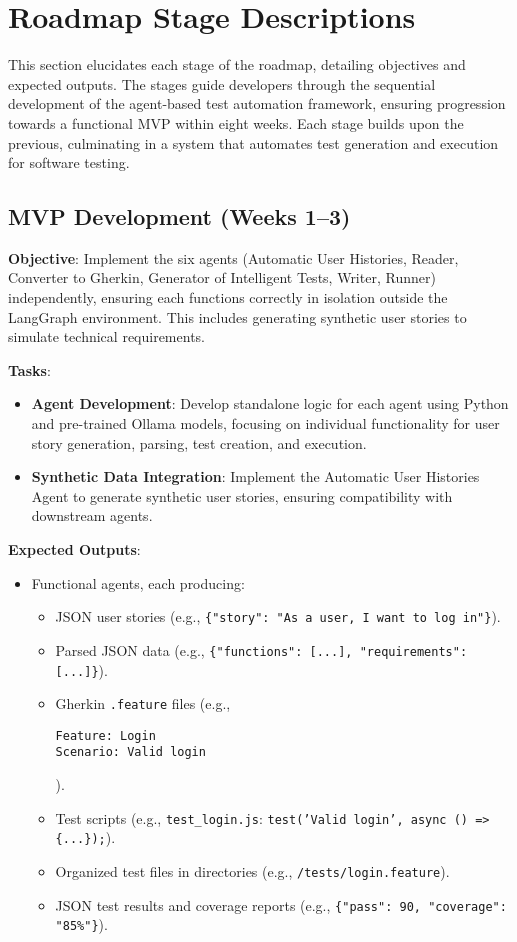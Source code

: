 \documentclass{article}
\begin{document}
\section{Roadmap Stage Descriptions}
This section elucidates each stage of the roadmap, detailing objectives and expected outputs. The stages guide developers through the sequential development of the agent-based test automation framework, ensuring progression towards a functional MVP within eight weeks. Each stage builds upon the previous, culminating in a system that automates test generation and execution for software testing.

\subsection{MVP Development (Weeks 1--3)}
\textbf{Objective}: Implement the six agents (Automatic User Histories, Reader, Converter to Gherkin, Generator of Intelligent Tests, Writer, Runner) independently, ensuring each functions correctly in isolation outside the LangGraph environment. This includes generating synthetic user stories to simulate technical requirements.

\textbf{Tasks}:
\begin{itemize}[label=--]
    \item \textbf{Agent Development}: Develop standalone logic for each agent using Python and pre-trained Ollama models, focusing on individual functionality for user story generation, parsing, test creation, and execution.
    \item \textbf{Synthetic Data Integration}: Implement the Automatic User Histories Agent to generate synthetic user stories, ensuring compatibility with downstream agents.
\end{itemize}

\textbf{Expected Outputs}:
\begin{itemize}[label=--]
    \item Functional agents, each producing:
    \begin{itemize}[label=$\circ$]
        \item JSON user stories (e.g., \texttt{\{"story": "As a user, I want to log in"\}}).
        \item Parsed JSON data (e.g., \texttt{\{"functions": [...], "requirements": [...]\}}).
        \item Gherkin \texttt{.feature} files (e.g., \begin{verbatim}Feature: Login
Scenario: Valid login\end{verbatim}).
        \item Test scripts (e.g., \texttt{test\_login.js}: \texttt{test('Valid login', async () => \{...\});}).
        \item Organized test files in directories (e.g., \texttt{/tests/login.feature}).
        \item JSON test results and coverage reports (e.g., \texttt{\{"pass": 90, "coverage": "85\%"\}}).
    \end{itemize}
\end{itemize}
\end{document}
